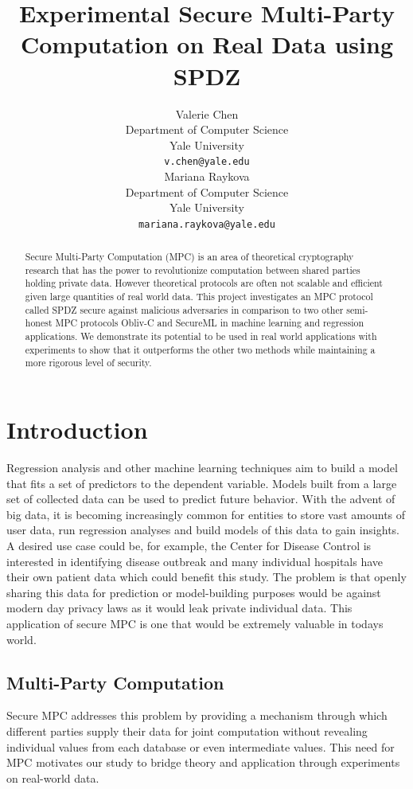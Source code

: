\documentclass{article}
\title{Experimental Secure Multi-Party Computation on Real Data using SPDZ}
\author{
  Valerie Chen\\
  Department of Computer Science\\
  Yale University\\
  \texttt{v.chen@yale.edu} \\
  \And
  Mariana Raykova \\
  Department of Computer Science\\
  Yale University \\
  \texttt{mariana.raykova@yale.edu} \\
}
\begin{document}
\maketitle

\begin{abstract}
  Secure Multi-Party Computation (MPC) is an area of theoretical cryptography research that has the power to revolutionize computation between shared parties holding private data. However theoretical protocols are often not scalable and efficient given large quantities of real world data. This project investigates an MPC protocol called SPDZ secure against malicious adversaries in comparison to two other semi-honest MPC protocols Obliv-C and SecureML in machine learning and regression applications. We demonstrate its potential to be used in real world applications with experiments to show that it outperforms the other two methods while maintaining a more rigorous level of security.
\end{abstract}

\section{Introduction}

Regression analysis and other machine learning techniques aim to build a model that fits a set of predictors to the dependent variable. Models built from a large set of collected data can be used to predict future behavior. With the advent of big data, it is becoming increasingly common for entities to store vast amounts of user data, run regression analyses and build models of this data to gain insights. A desired use case could be, for example, the Center for Disease Control is interested in identifying disease outbreak and many individual hospitals have their own patient data which could benefit this study. The problem is that openly sharing this data for prediction or model-building purposes would be against modern day privacy laws as it would leak private individual data. This application of secure MPC is one that would be extremely valuable in today\textquotesingle s world.

\subsection{Multi-Party Computation}

Secure MPC addresses this problem by providing a mechanism through which different parties supply their data for joint computation without revealing individual values from each database or even intermediate values. This need for MPC motivates our study to bridge theory and application through experiments on real-world data. 
\end{document}

